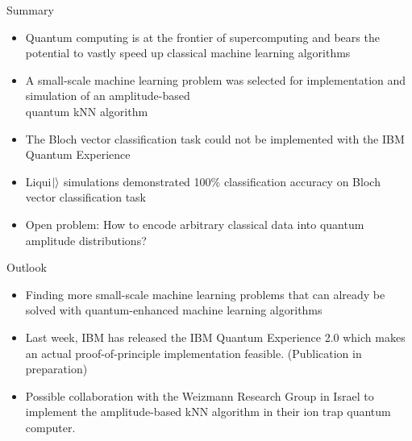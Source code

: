 \documentclass[10pt]{beamer}
\begin{document}
\begin{frame}{Summary}
\begin{itemize}
\item Quantum computing is at the frontier of supercomputing and bears the potential to vastly speed up classical machine learning algorithms
\item A small-scale machine learning problem was selected for implementation and simulation of an amplitude-based\\quantum kNN algorithm
\item The Bloch vector classification task could not be implemented with the IBM Quantum Experience
\item Liqui$\ket{}$ simulations demonstrated 100\% classification accuracy on Bloch vector classification task
\item Open problem: How to encode arbitrary classical data into quantum amplitude distributions?
\end{itemize}
\end{frame}

\begin{frame}{Outlook}

\begin{itemize}
\item Finding more small-scale machine learning problems that can already be solved with quantum-enhanced machine learning algorithms
\item Last week, IBM has released the IBM Quantum Experience 2.0 which makes an actual proof-of-principle implementation feasible. (Publication in preparation)
\item Possible collaboration with the Weizmann Research Group in Israel to implement the amplitude-based kNN algorithm in their ion trap quantum computer.
\end{itemize}
\end{frame}
\end{document}
